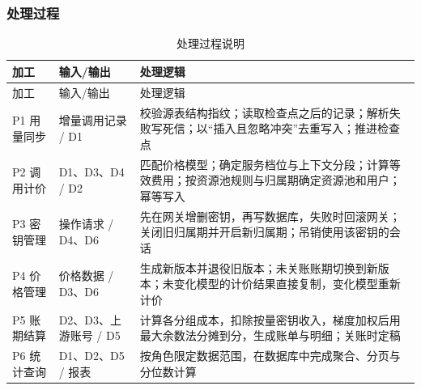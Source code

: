 \subsubsection{处理过程}

\begin{longtable}{@{}p{}p{}p{}@{}}
\caption{处理过程说明}\\
\toprule 加工 & 输入/输出 & 处理逻辑 \\ \midrule\endfirsthead
\toprule 加工 & 输入/输出 & 处理逻辑 \\ \midrule\endhead
P1 用量同步 & 增量调用记录 / D1 & 校验源表结构指纹；读取检查点之后的记录；解析失败写死信；以“插入且忽略冲突”去重写入；推进检查点 \\
P2 调用计价 & D1、D3、D4 / D2 & 匹配价格模型；确定服务档位与上下文分段；计算等效费用；按资源池规则与归属期确定资源池和用户；幂等写入 \\
P3 密钥管理 & 操作请求 / D4、D6 & 先在网关增删密钥，再写数据库，失败时回滚网关；关闭旧归属期并开启新归属期；吊销使用该密钥的会话 \\
P4 价格管理 & 价格数据 / D3、D6 & 生成新版本并退役旧版本；未关账账期切换到新版本；未变化模型的计价结果直接复制，变化模型重新计价 \\
P5 账期结算 & D2、D3、上游账号 / D5 & 计算各分组成本，扣除按量密钥收入，梯度加权后用最大余数法分摊到分，生成账单与明细；关账时定稿 \\
P6 统计查询 & D1、D2、D5 / 报表 & 按角色限定数据范围，在数据库中完成聚合、分页与分位数计算 \\
\bottomrule
\end{longtable}
